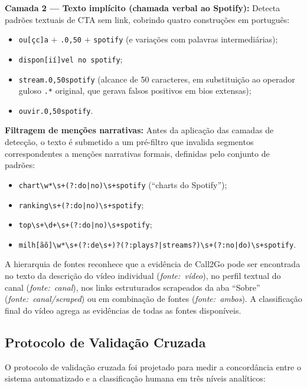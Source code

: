 \documentclass[12pt, a4paper]{article}
\begin{document}
\textbf{Camada 2 --- Texto implícito (chamada verbal ao Spotify):} Detecta padrões textuais de CTA sem link, cobrindo quatro construções em português:
\begin{itemize}
    \item \texttt{ou[çc]a} $+$ \texttt{.{0,50}} $+$ \texttt{spotify} (e variações com palavras intermediárias);
    \item \texttt{dispon[ií]vel no spotify};
    \item \texttt{stream.{0,50}spotify} (alcance de 50 caracteres, em substituição ao operador guloso \texttt{.*} original, que gerava falsos positivos em bios extensas);
    \item \texttt{ouvir.{0,50}spotify}.
\end{itemize}

\textbf{Filtragem de menções narrativas:} Antes da aplicação das camadas de detecção, o texto é submetido a um pré-filtro que invalida segmentos correspondentes a menções narrativas formais, definidas pelo conjunto de padrões:
\begin{itemize}
    \item \texttt{chart\textbackslash w*\textbackslash s+(?:do|no)\textbackslash s+spotify} (``charts do Spotify'');
    \item \texttt{ranking\textbackslash s+(?:do|no)\textbackslash s+spotify};
    \item \texttt{top\textbackslash s+\textbackslash d+\textbackslash s+(?:do|no)\textbackslash s+spotify};
    \item \texttt{milh[ãõ]\textbackslash w*\textbackslash s+(?:de\textbackslash s+)?(?:plays?|streams?)\textbackslash s+(?:no|do)\textbackslash s+spotify}.
\end{itemize}

A hierarquia de fontes reconhece que a evidência de Call2Go pode ser encontrada no texto da descrição do vídeo individual (\textsl{fonte:~vídeo}), no perfil textual do canal (\textsl{fonte:~canal}), nos links estruturados scrapeados da aba ``Sobre'' (\textsl{fonte:~canal/scraped}) ou em combinação de fontes (\textsl{fonte:~ambos}). A classificação final do vídeo agrega as evidências de todas as fontes disponíveis.

\subsection{Protocolo de Validação Cruzada}

O protocolo de validação cruzada foi projetado para medir a concordância entre o sistema automatizado e a classificação humana em três níveis analíticos:
\end{document}
